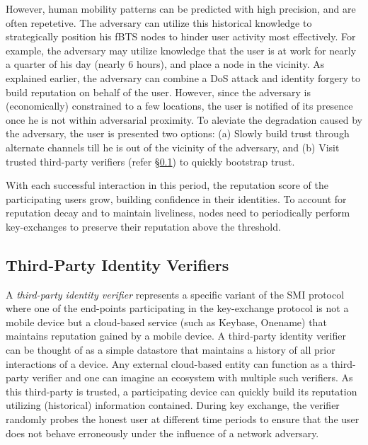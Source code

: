 \documentclass[letterpaper,twocolumn]{sig-alternate}
\begin{document}
\vspace{1mm}
However, human mobility patterns can be predicted with high precision, and are often repetetive. The adversary can utilize this historical knowledge to strategically position his fBTS nodes to hinder user activity most effectively. For example, the adversary may utilize knowledge that the user is at work for nearly a quarter of his day (nearly $6$ hours), and place a node in the vicinity. As explained earlier, the adversary can combine a DoS attack and identity forgery to build reputation on behalf of the user. However, since the adversary is (economically) constrained to a few locations, the user is notified of its presence once he is not within adversarial proximity. To aleviate the degradation caused by the adversary, the user is presented two options: (a) Slowly build trust through alternate channels till he is out of the vicinity of the adversary, and (b) Visit trusted third-party verifiers (refer \S \ref{tpiv}) to quickly bootstrap trust. 

\vspace{1mm}
With each successful interaction in this period, the reputation score of the participating users grow, building confidence in their identities. To account for reputation decay and to maintain liveliness, nodes need to periodically perform key-exchanges to preserve their reputation above the threshold.

\subsection{Third-Party Identity Verifiers}
\label{tpiv}

A {\em third-party identity verifier} represents a specific variant of the SMI protocol where one of the end-points participating in the key-exchange protocol is not a mobile device but a cloud-based service (such as Keybase, Onename) that maintains reputation gained by a mobile device. A third-party identity verifier can be thought of as a simple datastore that maintains a history of all prior interactions of a device. Any external cloud-based entity can function as a third-party verifier and one can imagine an ecosystem with multiple such verifiers. As this third-party is trusted, a participating device can quickly build its reputation utilizing (historical) information contained. During key exchange, the verifier randomly probes the honest user at different time periods to ensure that the user does not behave erroneously under the influence of a network adversary. 
\end{document}
